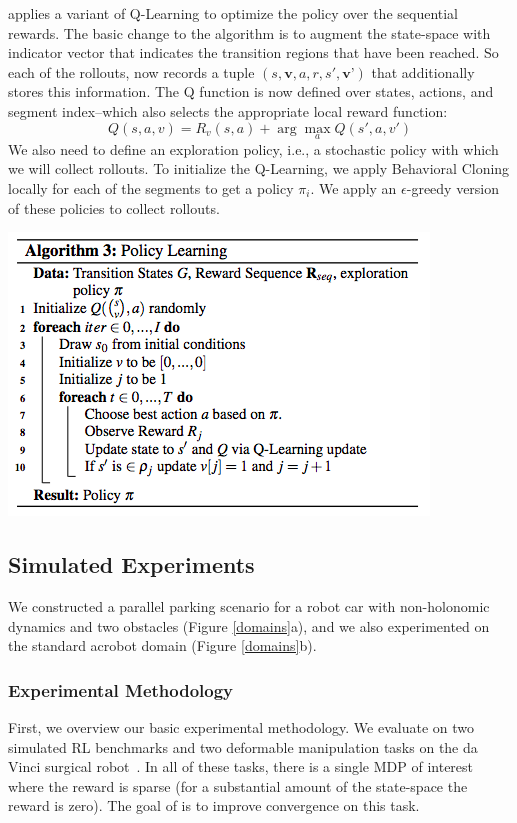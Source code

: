 \hirl applies a variant of Q-Learning to optimize the policy over the sequential rewards. The basic change to the algorithm is to augment the state-space with indicator vector that indicates the transition regions that have been reached. So each of the rollouts, now records a tuple $(s,\textbf{v},a,r, s', \textbf{v'})$ that additionally stores this information. The Q function is now defined over states, actions, and segment index--which also selects the appropriate local reward function:
\[
Q(s,a,v) = R_v(s,a) + \arg \max_{a} Q(s',a, v')
\]
We also need to define an exploration policy, i.e., a stochastic policy with which we will collect rollouts. To initialize the Q-Learning, we apply Behavioral Cloning locally for each of the segments to get a policy $\pi_i$. We apply an $\epsilon$-greedy version of these policies to collect rollouts.

\includegraphics[width=0.8\linewidth]{swirl-experiments/swirl-alg.png}

\subsection{Simulated Experiments}
We constructed a parallel parking scenario for a robot car with non-holonomic dynamics and two obstacles (Figure \ref{domains}a), and we also experimented on the standard acrobot domain (Figure \ref{domains}b).

\subsubsection{Experimental Methodology}
First, we overview our basic experimental methodology. We evaluate \hirl on two simulated RL benchmarks and two deformable manipulation tasks on the da Vinci surgical robot~\cite{kazanzides2014open}. In all of these tasks, there is a single MDP of interest where the  reward is sparse (for a substantial amount of the state-space the reward is zero). The goal of \hirl is to improve convergence on this task.

